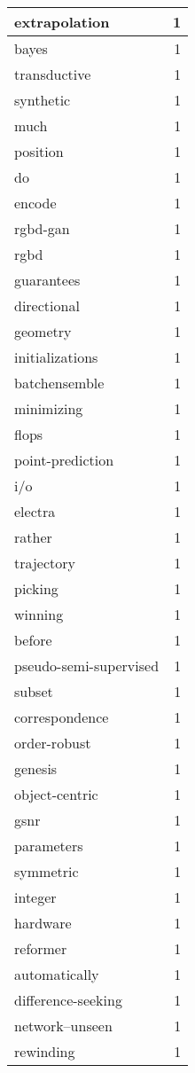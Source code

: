 \begin{table}[h]
\begin{tabular}{|l|r|}
extrapolation & 1 \\
\hline
bayes & 1 \\
\hline
transductive & 1 \\
\hline
synthetic & 1 \\
\hline
much & 1 \\
\hline
position & 1 \\
\hline
do & 1 \\
\hline
encode & 1 \\
\hline
rgbd-gan & 1 \\
\hline
rgbd & 1 \\
\hline
guarantees & 1 \\
\hline
directional & 1 \\
\hline
geometry & 1 \\
\hline
initializations & 1 \\
\hline
batchensemble & 1 \\
\hline
minimizing & 1 \\
\hline
flops & 1 \\
\hline
point-prediction & 1 \\
\hline
i/o & 1 \\
\hline
electra & 1 \\
\hline
rather & 1 \\
\hline
trajectory & 1 \\
\hline
picking & 1 \\
\hline
winning & 1 \\
\hline
before & 1 \\
\hline
pseudo-semi-supervised & 1 \\
\hline
subset & 1 \\
\hline
correspondence & 1 \\
\hline
order-robust & 1 \\
\hline
genesis & 1 \\
\hline
object-centric & 1 \\
\hline
gsnr & 1 \\
\hline
parameters & 1 \\
\hline
symmetric & 1 \\
\hline
integer & 1 \\
\hline
hardware & 1 \\
\hline
reformer & 1 \\
\hline
automatically & 1 \\
\hline
difference-seeking & 1 \\
\hline
network--unseen & 1 \\
\hline
rewinding & 1 \\

\end{tabular}
\end{table}
